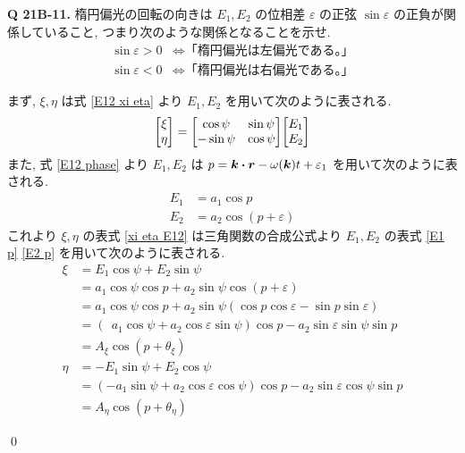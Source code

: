 \documentclass[uplatex,dvipdfmx,a4paper,11pt]{jlreq}
\makeatletter
\newcommand{\rr}{\bm{r}}
\newcommand{\kk}{\bm{k}}
\theoremstyle{definition}
\renewenvironment{proof}[1][\proofname]{\par
  \normalfont
  \topsep6\p@\@plus6\p@ \trivlist
  \item[\hskip\labelsep{\bfseries #1}\@addpunct{\bfseries}]\ignorespaces\quad\par
}{%
  \qed\endtrivlist\@endpefalse
}
\renewcommand\proofname{証明}
\makeatother
\begin{document}
\textbf{Q 21B-11.}
楕円偏光の回転の向きは $E_1, E_2$ の位相差 $\varepsilon$ の正弦 $\sin\varepsilon$ の正負が関係していること, つまり次のような関係となることを示せ.
\begin{align}
  \sin\varepsilon > 0 & \iff \textrm{「楕円偏光は左偏光である。」} \\
  \sin\varepsilon < 0 & \iff \textrm{「楕円偏光は右偏光である。」}
\end{align}
\begin{proof}
  まず, $\xi,\eta$ は式 \eqref{E12 xi eta} より $E_1, E_2$ を用いて次のように表される.
  \begin{align}
    \mqty[\xi \\ \eta] = \mqty[\cos\psi & \sin\psi \\ -\sin\psi & \cos\psi]\mqty[E_1 \\ E_2] \label{xi eta E12}
  \end{align}
  また, 式 \eqref{E12 phase} より $E_1, E_2$ は $p = \kk\vdot\rr - \omega(\kk)t + \varepsilon_1$ を用いて次のように表される.
  \begin{align}
    E_1 & = a_1\cos{p}            \label{E1 p}    \\
    E_2 & = a_2\cos(p + \varepsilon) \label{E2 p}
  \end{align}
  これより $\xi, \eta$ の表式 \eqref{xi eta E12} は三角関数の合成公式より $E_1, E_2$ の表式 \eqref{E1 p} \eqref{E2 p} を用いて次のように表される.
  \begin{align}
    \xi  & = E_1\cos\psi + E_2\sin\psi                                                                  \\
         & = a_1\cos\psi\cos{p} + a_2\sin\psi\cos(p + \varepsilon)                                      \\
         & = a_1\cos\psi\cos{p} + a_2\sin\psi(\cos{p}\cos\varepsilon - \sin{p}\sin\varepsilon)          \\
         & = (\ \  a_1\cos\psi + a_2\cos\varepsilon\sin\psi)\cos{p} - a_2\sin\varepsilon\sin\psi\sin{p} \\
         & = A_\xi\cos(p + \theta_\xi) \label{xi}                                                       \\
    \eta & = -E_1\sin\psi + E_2\cos\psi                                                                 \\
         & = (-a_1\sin\psi + a_2\cos\varepsilon\cos\psi)\cos{p} - a_2\sin\varepsilon\cos\psi\sin{p}     \\
         & = A_\eta\cos(p + \theta_\eta) \label{eta}
  \end{align}

\end{proof}
\end{document}
